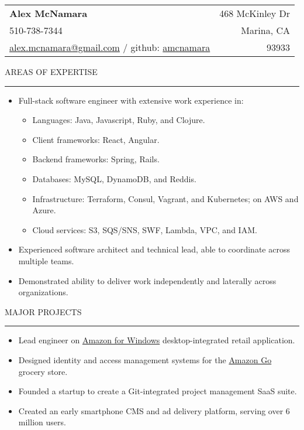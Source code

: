 \documentclass[12pt]{article}
\makeatletter
\newenvironment{justifycolumns}
{\begin{tabular*}{\textwidth}{@{\extracolsep{\fill}}lr@{}}}
{\end{tabular*}}
\newcommand{\row}[2]{#1 & #2 \\}
\newcommand{\blockseparation}{\vspace{0.15in}}
\newcommand{\heading}[1]{
	\blockseparation
	\uppercase{#1}
	\vspace{0.05in}
	\hrule
	\blockseparation
}
\newenvironment{tightbullets}
{\begin{itemize}}
{\end{itemize}}
\newenvironment{bullets}
{\begin{tightbullets}}
{\end{tightbullets} \blockseparation}
\makeatother
\begin{document}
\begin{flushleft}

\begin{justifycolumns}
	\row{\Large\textbf{Alex McNamara}}{468 McKinley Dr}
	\row{510-738-7344}{Marina, CA}
	\row{
		\href{mailto:alex.mcnamara@gmail.com}{alex.mcnamara@gmail.com} / github: 
		\href{http://www.github.com/amcnamara}{amcnamara}
	}{93933}
\end{justifycolumns}

\blockseparation


\heading{Areas of Expertise}

\begin{bullets}
	\item Full-stack software engineer with extensive work experience in:
	
	\begin{tightbullets}
		\item Languages: Java, Javascript, Ruby, and Clojure.
		\item Client frameworks: React, Angular.
		\item Backend frameworks: Spring, Rails.
		\item Databases: MySQL, DynamoDB, and Reddis.
		\item Infrastructure: Terraform, Consul, Vagrant, and Kubernetes; on AWS and Azure.
		\item Cloud services: S3, SQS/SNS, SWF, Lambda, VPC, and IAM.
	\end{tightbullets}

	\item Experienced software architect and technical lead, able to coordinate across multiple teams.
	\item Demonstrated ability to deliver work independently and laterally across organizations.
\end{bullets}


\heading{Major Projects}

\begin{bullets}
	\item Lead engineer on \href{http://apps.microsoft.com/windows/en-us/app/amazon/80299018-3dee-418d-8466-374fe9463309}{Amazon for Windows} desktop-integrated retail application.
	\item Designed identity and access management systems for the \href{https://www.amazon.com/b?ie=UTF8\&node=16008589011}{Amazon Go} grocery store.
	\item Founded a startup to create a Git-integrated project management SaaS suite.
	\item Created an early smartphone CMS and ad delivery platform, serving over 6 million users.
\end{bullets}



\end{flushleft}
\end{document}
